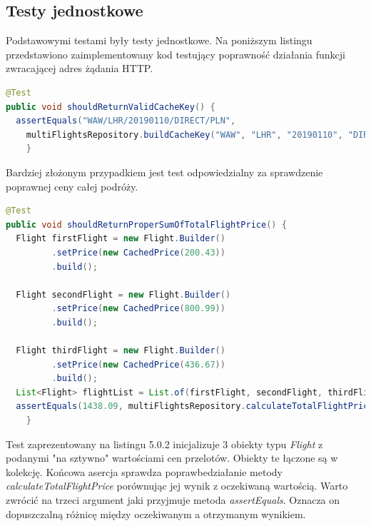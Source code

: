 \documentclass[12pt, twoside]{report}
\begin{document}
\subsection{Testy jednostkowe}
Podstawowymi testami były testy jednostkowe. Na poniższym listingu przedstawiono zaimplementowany kod testujący poprawność działania funkcji zwracającej adres żądania HTTP.
\begin{lstlisting}[language=java, caption=Przykładowy test jednostkowy]
@Test
public void shouldReturnValidCacheKey() {
  assertEquals("WAW/LHR/20190110/DIRECT/PLN",
    multiFlightsRepository.buildCacheKey("WAW", "LHR", "20190110", "DIRECT", "PLN"));
    }
\end{lstlisting}
Bardziej złożonym przypadkiem jest test odpowiedzialny za sprawdzenie poprawnej ceny całej podróży.
\begin{lstlisting}[language=java, caption=Przykładowy test jednostkowy]
@Test
public void shouldReturnProperSumOfTotalFlightPrice() {
  Flight firstFlight = new Flight.Builder()
         .setPrice(new CachedPrice(200.43))
         .build();
 
  Flight secondFlight = new Flight.Builder()
         .setPrice(new CachedPrice(800.99))
         .build();

  Flight thirdFlight = new Flight.Builder()
         .setPrice(new CachedPrice(436.67))
         .build();
  List<Flight> flightList = List.of(firstFlight, secondFlight, thirdFlight);
  assertEquals(1438.09, multiFlightsRepository.calculateTotalFlightPrice(flightList), 0.001);
    }
\end{lstlisting}
Test zaprezentowany na listingu 5.0.2 inicjalizuje 3 obiekty typu \textit{Flight} z podanymi "na sztywno" wartościami cen przelotów. Obiekty te łączone są w kolekcję. Końcowa asercja sprawdza poprawbedziałanie metody \textit{calculateTotalFlightPrice} porównując jej wynik z oczekiwaną wartością. Warto zwrócić na trzeci argument jaki przyjmuje metoda \textit{assertEquals}. Oznacza on dopuszczalną różnicę między oczekiwanym a otrzymanym wynikiem.
\newpage
\end{document}
